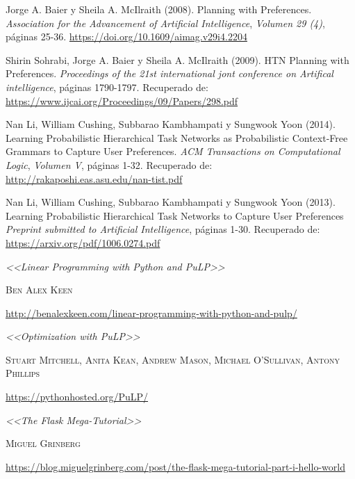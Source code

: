 \documentclass[a4paper]{article}
\begin{document}
\begin{thebibliography}{X}
Jorge A. Baier y Sheila A. McIlraith (2008). Planning with Preferences. \textit{Association for the Advancement of Artificial Intelligence}, \textit{Volumen 29 (4)}, páginas 25-36.
\url{https://doi.org/10.1609/aimag.v29i4.2204}


Shirin Sohrabi, Jorge A. Baier y Sheila A. McIlraith (2009). HTN Planning with Preferences. \textit{Proceedings of the 21st international jont conference on Artifical intelligence},  páginas 1790-1797.
Recuperado de: \url{https://www.ijcai.org/Proceedings/09/Papers/298.pdf}


 Nan Li, William Cushing, Subbarao Kambhampati y Sungwook Yoon (2014). Learning Probabilistic Hierarchical Task Networks as Probabilistic Context-Free Grammars to Capture User Preferences. \textit{ACM Transactions on Computational Logic}, \textit{Volumen V}, páginas 1-32.
Recuperado de: \url{http://rakaposhi.eas.asu.edu/nan-tist.pdf}


 Nan Li, William Cushing, Subbarao Kambhampati y Sungwook Yoon (2013). Learning Probabilistic Hierarchical Task Networks to Capture User Preferences \textit{Preprint submitted to Artificial Intelligence}, páginas 1-30.
Recuperado de: \url{https://arxiv.org/pdf/1006.0274.pdf}


 \textit{<<Linear Programming with Python and PuLP>>}

\textsc{Ben Alex Keen}

\url{http://benalexkeen.com/linear-programming-with-python-and-pulp/}


 \textit{<<Optimization with PuLP>>}

\textsc{Stuart Mitchell, Anita Kean, Andrew Mason, Michael O’Sullivan, Antony Phillips}

\url{https://pythonhosted.org/PuLP/}


 \textit{<<The Flask Mega-Tutorial>>}

\textsc{Miguel Grinberg}

\url{https://blog.miguelgrinberg.com/post/the-flask-mega-tutorial-part-i-hello-world}


\end{thebibliography}
\end{document}
